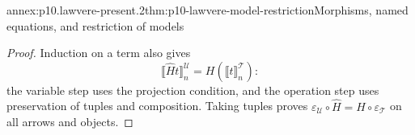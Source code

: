 \begin{annexitem}{annex:p10.lawvere-present.2}{thm:p10-lawvere-model-restriction}{Morphisms, named equations, and restriction of models}
\begin{proof}
Induction on a term also gives
\[
                  \llbracket\widehat Ht\rrbracket_n^{\mathcal U}
                                 =H(\llbracket t\rrbracket_n^{\mathcal T}):
\]
the variable step uses the projection condition, and the
operation step uses preservation of tuples and composition.
Taking tuples proves
\(\varepsilon_{\mathcal U}\circ\widehat H
       =H\circ\varepsilon_{\mathcal T}\) on all arrows and objects.
\end{proof}
\end{annexitem}
